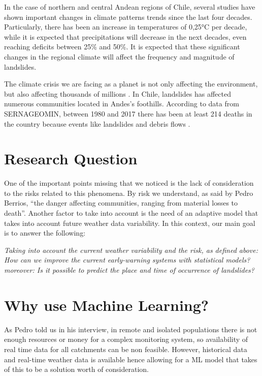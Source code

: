 \documentclass[sigconf, nonacm]{acmart}
\begin{document}
In the case of northern and central Andean regions of Chile, several studies \cite{boisier, falvey, garreaud} have shown important changes in climate patterns trends since the last four decades. Particularly, there has been an increase in temperatures of 0,25°C per decade, while it is expected that precipitations will decrease in the next decades, even reaching deficits between 25\% and 50\%. It is expected that these significant changes in the regional climate will affect the frequency and magnitude of landslides.

The climate crisis we are facing as a planet is not only affecting the environment, but also affecting thousands of millions \cite{landslidesandclimatechange}. In Chile, landslides has affected numerous communities located in Andes's foothills. According to data from SERNAGEOMIN, between 1980 and 2017 there has been at least 214 deaths in the country because events like landslides and debris flows \cite{sernageomin}.

\section{Research Question}

One of the important points missing that we noticed is the lack of consideration to the risks related to this phenomena. By risk we understand, as said by Pedro Berrios, ``the danger affecting communities, ranging from material losses to death''. Another factor to take into account is the need of an adaptive model that takes into account future weather data variability. In this context, our main goal is to answer the following: 



\textit{Taking into account the current weather variability and the risk, as defined above: How can we improve the current early-warning systems with statistical models? moreover: Is it possible to predict the place and time of occurrence of landslides?}


\section{Why use Machine Learning?}

As Pedro told us in his interview, in remote and isolated populations there is not enough resources or money for a complex monitoring system, so availability of real time data for all catchments can be non feasible. However, historical data and real-time weather data is available hence allowing for a ML model that takes of this to be a solution worth of consideration.   
\end{document}
